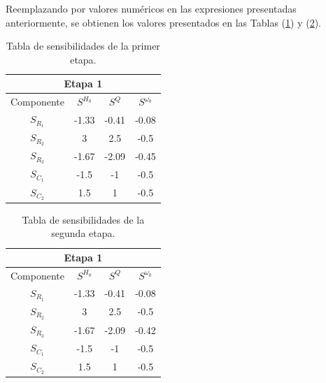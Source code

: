 Reemplazando por valores numéricos en las expresiones presentadas anteriormente, se obtienen los valores presentados en las Tablas (\ref{tab:ses1}) y (\ref{tab:ses2}).
\begin{table}[H]
\centering
\begin{tabular}{cccc}
\hline
\multicolumn{4}{c}{Etapa 1}                                                                      \\ \hline
Componente                    & $S^{H_0}$               & $S^{Q}$               & $S^{\omega_0}$ \\ \hline
$S_{R_1}$                     & -1.33                   & -0.41                 & -0.08          \\
$S_{R_2}$                     & 3                       & 2.5                   & -0.5           \\
$S_{R_3}$                     & -1.67                   & -2.09                 & -0.45          \\
$S_{C_1}$                     & -1.5                    & -1                    & -0.5           \\
$S_{C_2}$ & 1.5 & 1 & -0.5        \\
\hline  
\end{tabular}
\caption{Tabla de sensibilidades de la primer etapa.}
\label{tab:ses1}
\end{table}
\begin{table}[H]
\centering
\begin{tabular}{cccc}
\hline
\multicolumn{4}{c}{Etapa 1}                                                                      \\ \hline
Componente                    & $S^{H_0}$               & $S^{Q}$               & $S^{\omega_0}$ \\ \hline
$S_{R_1}$                     & -1.33                   & -0.41                 & -0.08          \\
$S_{R_2}$                     & 3                       & 2.5                   & -0.5           \\
$S_{R_3}$                     & -1.67                   & -2.09                 & -0.42          \\
$S_{C_1}$                     & -1.5                    & -1                    & -0.5           \\
$S_{C_2}$ & 1.5 & 1 & -0.5        \\
\hline  
\end{tabular}
\caption{Tabla de sensibilidades de la segunda etapa.}
\label{tab:ses2}
\end{table}

